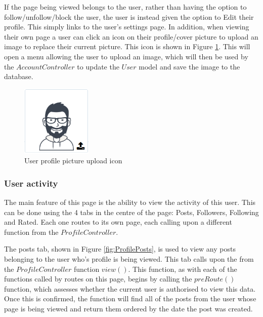 If the page being viewed belongs to the user, rather than having the option to follow/unfollow/block the user, the user is instead given the option to Edit their profile. This simply links to the user's settings page. In addition, when viewing their own page a user can click an icon on their profile/cover picture to upload an image to replace their current picture. This icon is shown in Figure \ref{fig:ProfilePicUpload}. This will open a menu allowing the user to upload an image, which will then be used by the $AccountController$ to update the $User$ model and save the image to the database.

\begin{figure}[H]
\centering
\includegraphics[width=0.3\textwidth]{Images/Implementation/ProfilePicUpload}
\caption{User profile picture upload icon}
\label{fig:ProfilePicUpload}
\end{figure}

\subsubsection{User activity}
The main feature of this page is the ability to view the activity of this user. This can be done using the 4 tabs in the centre of the page: Posts, Followers, Following and Rated. Each one routes to its own page, each calling upon a different function from the \(ProfileController\).

The posts tab, shown in Figure \ref{fig:ProfilePosts}, is used to view any posts belonging to the user who's profile is being viewed. This tab calls upon the from the \(ProfileController\) function \(view()\). This function, as with each of the functions called by routes on this page, begins by calling the \(preRoute()\) function, which assesses whether the current user is authorised to view this data. Once this is confirmed, the function will find all of the posts from the user whose page is being viewed and return them ordered by the date the post was created.

